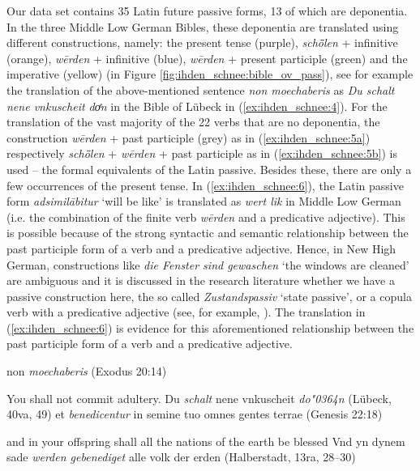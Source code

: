 \documentclass[output=paper,colorlinks,citecolor=brown]{langscibook}
\begin{document}
Our data set contains 35 Latin future passive forms, 13 of which are deponentia. In the three Middle Low German Bibles, these deponentia are translated using different constructions, namely: the present tense (purple), \textit{schȫlen} + infinitive (orange), \textit{wērden} + infinitive (blue), \textit{wērden} + present participle (green) and the imperative (yellow) (in Figure \ref{fig:ihden_schnee:bible_ov_pass}), see for example the translation of the above-mentioned sentence \textit{non moechaberis} as \textit{Du schalt nene vnkuscheit doͤn} in the Bible of Lübeck in (\ref{ex:ihden_schnee:4}). For the translation of the vast majority of the 22 verbs that are no deponentia, the construction \textit{wērden} + past participle (grey) as in (\ref{ex:ihden_schnee:5a}) respectively \textit{schȫlen} + \textit{wērden} + past participle as in (\ref{ex:ihden_schnee:5b}) is used -- the formal equivalents of the Latin passive. %
Besides these, there are only a few occurrences of the present tense. In (\ref{ex:ihden_schnee:6}), the Latin passive form \textit{adsimilābitur} `will be like' is translated as \textit{wert lik} in Middle Low German (i.e. the combination of the finite verb \textit{wērden} and a predicative adjective). This is possible because of the strong syntactic and semantic relationship between the past participle form of a verb and a predicative adjective. Hence, in New High German, constructions like \textit{die Fenster sind gewaschen} `the windows are cleaned' are ambiguous and it is discussed in the research literature whether we have a passive construction here, the so called \textit{Zustandspassiv} `state passive', or a copula verb with a predicative adjective (see, for example, \cite{Maienborn2007}). The translation in (\ref{ex:ihden_schnee:6}) is evidence for this aforementioned relationship between the past participle form of a verb and a predicative adjective.

\ea non \textit{moechaberis} (Exodus 20:14) \label{ex:ihden_schnee:4}
 
\exi{} You shall not commit adultery.
\ea Du \textit{schalt} nene vnkuscheit \textit{do\char"0364n} (Lübeck, 40va, 49)\label{ex:ihden_schnee:4a}
\z
\z 
\ea et \textit{benedicentur} in semine tuo omnes gentes terrae (Genesis 22:18) \label{ex:ihden_schnee:5}
 
\exi{} and in your offspring shall all the nations of the earth be blessed 
\ea Vnd yn dynem sade \textit{werden gebenediget} alle volk der erden (Halberstadt, 13ra, 28--30)\label{ex:ihden_schnee:5a}
\end{document}
